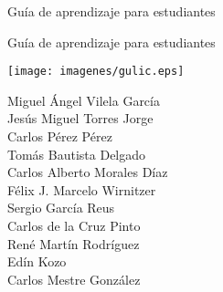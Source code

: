 
\pagestyle{empty}

\vspace*{20mm}
\begin{center}
{\LARGE Guía de aprendizaje para estudiantes}\vspace*{5mm}
\resizebox{\textwidth}{10mm}{{\LARGE\bf \titulo}}
\end{center}

\vfill
\cleardoublepage

\vspace*{20mm}
\begin{center}
{\LARGE Guía de aprendizaje para estudiantes}\vspace*{5mm}
\resizebox{\textwidth}{10mm}{{\LARGE\bf \titulo}}

\end{center}

\begin{center}
\vspace*{55mm}
\texttt{[image: imagenes/gulic.eps]}
\end{center}

\vfill

\begin{flushright}
{\large
Miguel Ángel Vilela García     \\ %
Jesús Miguel Torres Jorge      \\ %
Carlos Pérez Pérez             \\ %
Tomás Bautista Delgado         \\ %
Carlos Alberto Morales Díaz    \\ %
Félix J. Marcelo Wirnitzer     \\ %
Sergio García Reus             \\ %
Carlos de la Cruz Pinto        \\ %
René Martín Rodríguez          \\ %
Edín Kozo                      \\ %
Carlos Mestre González         \\ %
}
\end{flushright}

